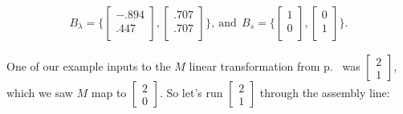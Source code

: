 \vspace{-.15in}
\begin{align*}
B_\lambda = \Bigg\{
\begin{bmatrix}
-.894 \\
.447 \\
\end{bmatrix}, 
\begin{bmatrix}
.707 \\
.707 \\
\end{bmatrix} \Bigg\}, \ \textrm{and}\ \ 
B_s = \Bigg\{
\begin{bmatrix}
1 \\
0 \\
\end{bmatrix}, 
\begin{bmatrix}
0 \\
1 \\
\end{bmatrix} \Bigg\}.
\end{align*}
\vspace{-.15in}

One of our example inputs to the $M$ linear transformation from
p.~\pageref{thatExample} was {\footnotesize $\begin{bmatrix} 2 \\ 1
\end{bmatrix}$}, which we saw $M$ map to {\footnotesize $\begin{bmatrix} 2 \\ 0
\end{bmatrix}$}. So let's run {\footnotesize $\begin{bmatrix} 2 \\ 1
\end{bmatrix}$} through the assembly line:

